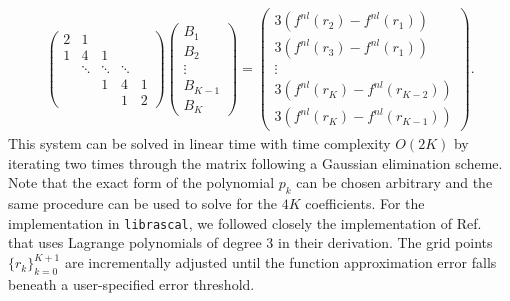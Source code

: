 \begin{subequations}
\begin{align}
\begin{pmatrix}
    2 & 1       &           &       &    \\
    1 & 4       & 1         &           &    \\
      & \ddots  & \ddots    & \ddots    &           \\
      &         & 1         &     4     & 1   \\
      &         &           &     1     & 2
\end{pmatrix}
\begin{pmatrix}
B_1\\
B_2\\
\vdots\\
B_{K-1}\\
B_{K}
\end{pmatrix}
=
\begin{pmatrix}
3(f^{nl}(r_2)-f^{nl}(r_1))\\
3(f^{nl}(r_3)-f^{nl}(r_1))\\
\vdots\\
3(f^{nl}(r_K)-f^{nl}(r_{K-2}))\\
3(f^{nl}(r_K)-f^{nl}(r_{K-1}))
\end{pmatrix}.
\end{align}
\end{subequations}
This system can be solved in linear time with time complexity $O(2K)$ by iterating two times through the matrix following a Gaussian elimination scheme.
Note that the exact form of the polynomial $p_k$ can be chosen arbitrary and the same procedure can be used to solve for the $4K$ coefficients.
For the implementation in \texttt{librascal}, we followed closely the implementation of Ref.~\cite{press2007numerical} that uses Lagrange polynomials of degree 3 in their derivation.
The grid points $\{r_k\}_{k=0}^{K+1}$ are incrementally adjusted until the function approximation error falls beneath a user-specified error threshold.
